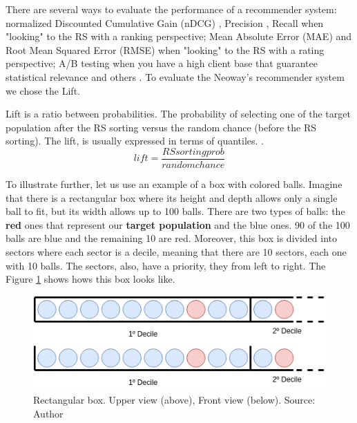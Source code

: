 There are several ways to evaluate the performance of a recommender system: normalized Discounted Cumulative Gain (nDCG) \cite{jarvelin2002cumulated}, Precision \cite{Precision-rs-metric}, Recall \cite{cremonesi2010performance} when "looking" to the RS with a ranking perspective; Mean Absolute Error (MAE) \cite{breese1998empirical} and Root Mean Squared Error (RMSE) \cite{bennett2007netflix} when "looking" to the RS with a rating perspective; A/B testing when you have a high client base that guarantee statistical relevance and others \cite{parra2013recommender}. To evaluate the Neoway's recommender system we chose the Lift.

Lift is a ratio between probabilities. The probability of selecting one of the target population after the RS sorting versus the random  chance (before the RS sorting). The lift, is usually expressed in terms of quantiles. \cite{LiftAnalysisADataScientistsSecretWeapon}.
\begin{equation}
	lift = \frac{RS sorting prob}{random chance}
\end{equation}

To illustrate further, let us use an example of a box with colored balls. Imagine that there is a rectangular box where its height and depth allows only a single ball to fit, but its width allows up to 100 balls. There are two types of balls: the \textbf{red} ones that represent our \textbf{target population} and the blue ones. 90 of the 100 balls are blue and the remaining 10 are red. Moreover, this box is divided into sectors where each sector is a decile, meaning that there are 10 sectors, each one with 10 balls. The sectors, also, have a priority, they from left to right. The Figure \ref{fig:rec-box} shows hows this box looks like.

\begin{figure}[h]
   \centering
   \includegraphics[width=\linewidth]{fig/ch2-rec-box.png}
   \caption{Rectangular box. Upper view (above), Front view (below).  Source: Author}
   \label{fig:rec-box}
\end{figure}

